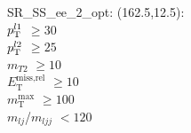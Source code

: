 SR\_SS\_ee\_2\_opt: (162.5,12.5): \\
$p_{\text{T}}^{l1}$ $\geq 30$ \\
$p_{\text{T}}^{l2}$ $\geq 25$ \\
$m_{T2}$ $\geq 10$ \\
$E_{\text{T}}^{\text{miss,rel}}$ $\geq 10$ \\
$m_{\text{T}}^{\text{max}}$ $\geq 100$ \\
$m_{lj}$/$m_{ljj}$ $<120$ \\
